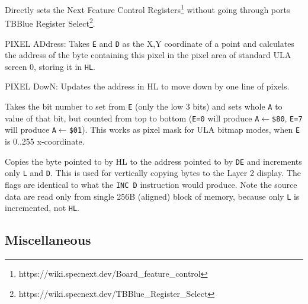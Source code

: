 \documentclass[twoside,openright,a4paper]{book}
\begin{document}
\begin{basedescript}{
	\desclabelstyle{\multilinelabel}
	\desclabelwidth{3cm}}


	Directly sets the Next Feature Control Registers\footnote{https://wiki.specnext.dev/Board\_feature\_control} without going through ports TBBlue Register Select\footnote{https://wiki.specnext.dev/TBBlue\_Register\_Select}.


	PIXEL ADdress: Takes {\tt E} and {\tt D} as the X,Y coordinate of a point and calculates the address of the byte containing this pixel in the pixel area of standard ULA screen 0, storing it in {\tt HL}.


	PIXEL DowN: Updates the address in HL to move down by one line of pixels.


	Takes the bit number to set from {\tt E} (only the low 3 bits) and sets whole {\tt A} to value of that bit, but counted from top to bottom ({\tt E=0} will produce {\tt A$\leftarrow$\$80}, {\tt E=7} will produce {\tt A$\leftarrow$\$01}). This works as pixel mask for ULA bitmap modes, when {\tt E} is 0..255 x-coordinate.
		

	Copies the byte pointed to by HL to the address pointed to by {\tt DE} and increments only {\tt L} and {\tt D}. This is used for vertically copying bytes to the Layer 2 display. The flags are identical to what the {\tt INC D} instruction would produce. Note the source data are read only from single 256B (aligned) block of memory, because only {\tt L} is incremented, not {\tt HL}.

\end{basedescript}

\subsection{Miscellaneous}
\end{document}
